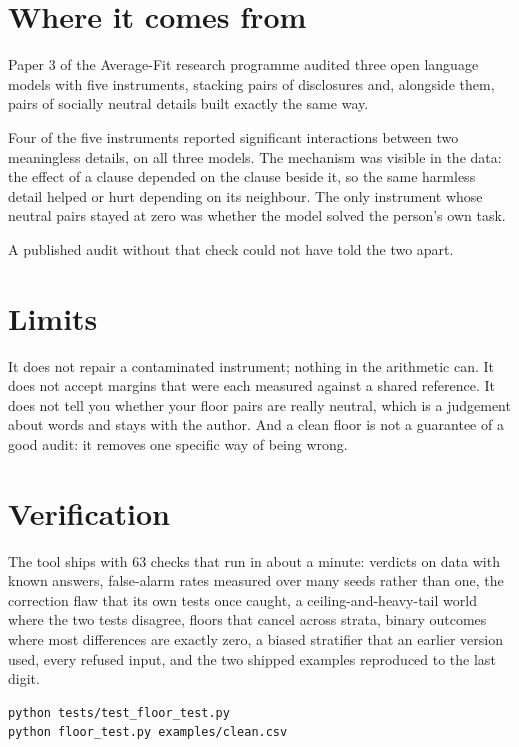 \documentclass[11pt]{article}
\begin{document}
\section*{Where it comes from}

Paper 3 of the Average-Fit research programme audited three open language models
with five instruments, stacking pairs of disclosures and, alongside them, pairs
of socially neutral details built exactly the same way.

Four of the five instruments reported significant interactions between two
meaningless details, on all three models. The mechanism was visible in the data:
the effect of a clause depended on the clause beside it, so the same harmless
detail helped or hurt depending on its neighbour. The only instrument whose
neutral pairs stayed at zero was whether the model solved the person's own task.

A published audit without that check could not have told the two apart.

\section*{Limits}

It does not repair a contaminated instrument; nothing in the arithmetic can. It
does not accept margins that were each measured against a shared reference. It
does not tell you whether your floor pairs are really neutral, which is a
judgement about words and stays with the author. And a clean floor is not a
guarantee of a good audit: it removes one specific way of being wrong.

\section*{Verification}

The tool ships with 63 checks that run in about a minute: verdicts on data with
known answers, false-alarm rates measured over many seeds rather than one, the
correction flaw that its own tests once caught, a ceiling-and-heavy-tail world
where the two tests disagree, floors that cancel across strata, binary outcomes
where most differences are exactly zero, a biased stratifier that an earlier
version used, every refused input, and the two shipped examples reproduced to
the last digit.

\begin{Verbatim}[fontsize=\small]
python tests/test_floor_test.py
python floor_test.py examples/clean.csv
\end{Verbatim}
\end{document}

